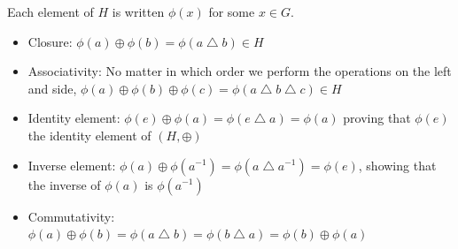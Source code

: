 \documentclass{article}
\begin{document}
\begin{tcolorbox}
Each element of $ H $ is written $ \phi(x) $ for some $ x \in G $.
\begin{itemize}
\item Closure: $ \phi(a) \oplus \phi(b) = \phi(a \bigtriangleup b) \in H $
\item Associativity: No matter in which order we perform the operations on the left and side, $ \phi(a) \oplus \phi(b) \oplus \phi(c) = \phi(a \bigtriangleup b \bigtriangleup c) \in H $
\item Identity element: $ \phi(e) \oplus \phi(a) = \phi(e \bigtriangleup a) = \phi(a) $ proving that $ \phi(e) $ the identity element of $ (H,\oplus) $
\item Inverse element: $ \phi(a) \oplus \phi(a^{-1}) = \phi(a \bigtriangleup a^{-1}) = \phi(e) $, showing that the inverse of $ \phi(a) $ is $ \phi(a^{-1}) $
\item Commutativity: $ \phi(a) \oplus \phi(b) = \phi(a \bigtriangleup b) = \phi(b \bigtriangleup a) = \phi(b) \oplus \phi(a) $
\end{itemize}
\end{tcolorbox}
\end{document}
